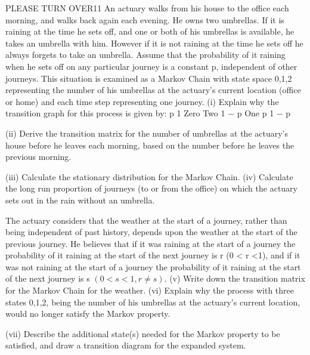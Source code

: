\documentclass[a4paper,12pt]{article}
\begin{document}
\begin{enumerate}

PLEASE TURN OVER11
An actuary walks from his house to the office each morning, and walks back again
each evening. He owns two umbrellas. If it is raining at the time he sets off, and one
or both of his umbrellas is available, he takes an umbrella with him. However if it is
not raining at the time he sets off he always forgets to take an umbrella.
Assume that the probability of it raining when he sets off on any particular journey is
a constant p, independent of other journeys.
This situation is examined as a Markov Chain with state space {0,1,2} representing
the number of his umbrellas at the actuary’s current location (office or home) and
each time step representing one journey.
(i)
Explain why the transition graph for this process is given by:
p
1
Zero
Two
1 − p
One
p
1 − p

(ii) Derive the transition matrix for the number of umbrellas at the actuary’s house
before he leaves each morning, based on the number before he leaves the
previous morning.

(iii) Calculate the stationary distribution for the Markov Chain.
(iv) Calculate the long run proportion of journeys (to or from the office) on which the actuary sets out in the rain without an umbrella.


The actuary considers that the weather at the start of a journey, rather than being independent of past history, depends upon the weather at the start of the previous journey. He believes that if it was raining at the start of a journey the probability of it
raining at the start of the next journey is r (0 < r <1), and if it was not raining at the
start of a journey the probability of it raining at the start of the next journey is
s $(0 < s < 1, r \neq s)$.
(v) Write down the transition matrix for the Markov Chain for the weather.
(vi) Explain why the process with three states {0,1,2}, being the number of his umbrellas at the actuary’s current location, would no longer satisfy the
Markov property.

(vii) Describe the additional state(s) needed for the Markov property to be satisfied, and draw a transition diagram for the expanded system.

\newpage



\end{enumerate}
\end{document}
